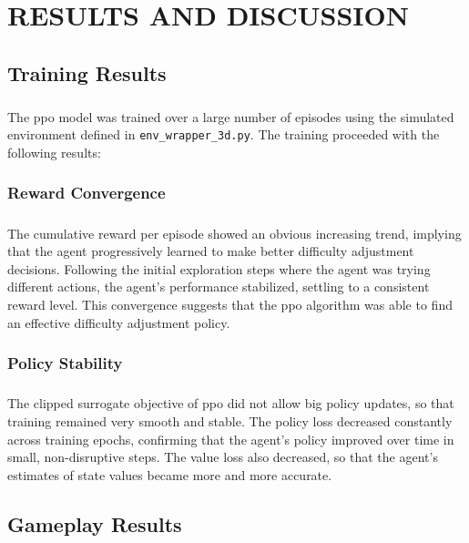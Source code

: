 \chapter{\MakeUppercase{Results and Discussion}}

\section{Training Results}
\paragraph{} The \ac{ppo} model was trained over a large number of episodes using the simulated environment defined in \texttt{env\_wrapper\_3d.py}. The training proceeded with the following results:

\subsection{Reward Convergence}
\paragraph{} The cumulative reward per episode showed an obvious increasing trend, implying that the agent progressively learned to make better difficulty adjustment decisions. Following the initial exploration steps where the agent was trying different actions, the agent's performance stabilized, settling to a consistent reward level. This convergence suggests that the \ac{ppo} algorithm was able to find an effective difficulty adjustment policy.

\subsection{Policy Stability}
\paragraph{} The clipped surrogate objective of \ac{ppo} did not allow big policy updates, so that training remained very smooth and stable. The policy loss decreased constantly across training epochs, confirming that the agent's policy improved over time in small, non-disruptive steps. The value loss also decreased, so that the agent's estimates of state values became more and more accurate.

\section{Gameplay Results}
